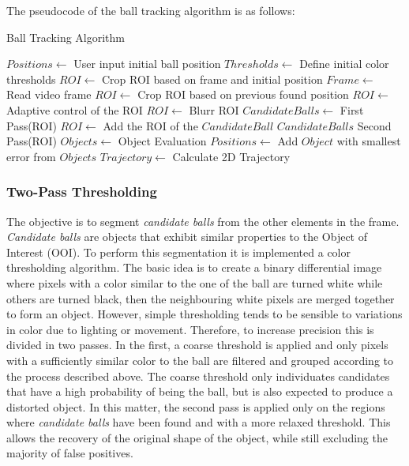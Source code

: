\documentclass[a4paper]{article}
\begin{document}
The pseudocode of the ball tracking algorithm is as follows:
\begin{algorithm}[H]
\caption{Ball Tracking Algorithm}
\begin{algorithmic}
    \State $ Positions \gets$ User input initial ball position
    \State $ Thresholds \gets$ Define initial color thresholds
    \State $ ROI \gets$ Crop ROI based on frame and initial position
    \State $ Frame \gets$ Read video frame
		\State $ROI \gets$ Crop ROI based on previous found position
\Else{}
	\State $ ROI \gets$ Adaptive control of the ROI
\EndIf
\State $ ROI \gets$ Blurr ROI 
\State $ Candidate Balls \gets$ First Pass(ROI) 
		\State $ROI \gets$ Add the ROI of the $CandidateBall$ 
	\EndFor
\State $Candidate Balls$ Second Pass(ROI) 
\State $Objects \gets$ Object Evaluation 
\State $Positions \gets$ Add $Object$ with smallest error from $Objects$
\EndIf
\EndWhile
\State $Trajectory \gets$ Calculate 2D Trajectory
\end{algorithmic}
\end{algorithm}


\subsubsection{Two-Pass Thresholding}

The objective is to segment \textit{candidate balls} from the other elements in the frame. \textit{Candidate balls} are objects that exhibit similar properties to the Object of Interest (OOI). To perform this segmentation it is implemented a color thresholding algorithm. The basic idea is to create a binary differential image where pixels with a color similar to the one of the ball are turned white while others are turned black, then the neighbouring white pixels are merged together to form an object. However, simple thresholding tends to be sensible to variations in color due to lighting or movement. Therefore, to increase precision this is divided in two passes. In the first, a coarse threshold is applied and only pixels with a sufficiently similar color to the ball are filtered and grouped according to the process described above. The coarse threshold only individuates candidates that have a high probability of being the ball, but is also expected to produce a distorted object. In this matter, the second pass is applied only on the regions where \textit{candidate balls} have been found and with a more relaxed threshold. This allows the recovery of the original shape of the object, while still excluding the majority of false positives. 
\end{document}
